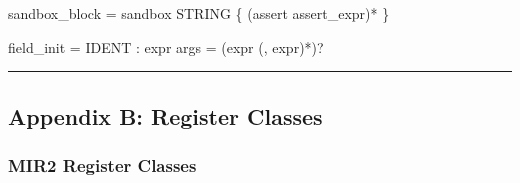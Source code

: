 \documentclass[
  11pt,
]{article}
\newenvironment{Shaded}{}{}
\newcommand{\NormalTok}[1]{#1}
\begin{document}
\begin{Shaded}
\begin{Highlighting}[]
\NormalTok{sandbox\_block  = \textquotesingle{}sandbox\textquotesingle{} STRING \textquotesingle{}\{\textquotesingle{} (\textquotesingle{}assert\textquotesingle{} assert\_expr)* \textquotesingle{}\}\textquotesingle{}}

\NormalTok{field\_init     = IDENT \textquotesingle{}:\textquotesingle{} expr}
\NormalTok{args           = (expr (\textquotesingle{},\textquotesingle{} expr)*)?}
\end{Highlighting}
\end{Shaded}

\begin{center}\rule{0.5\linewidth}{0.5pt}\end{center}

\subsection{Appendix B: Register
Classes}\label{appendix-b-register-classes}

\subsubsection{MIR2 Register Classes}\label{mir2-register-classes}
\end{document}

